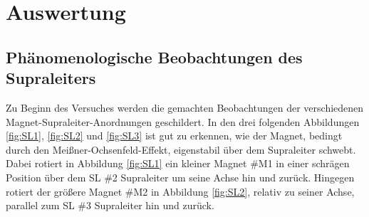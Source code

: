 \section{Auswertung}
\label{sec:Auswertung}

\subsection{Phänomenologische Beobachtungen des Supraleiters}
Zu Beginn des Versuches werden die gemachten Beobachtungen der verschiedenen
Magnet-Supraleiter-Anordnungen geschildert. In den drei folgenden Abbildungen
\ref{fig:SL1}, \ref{fig:SL2} und \ref{fig:SL3} ist gut zu erkennen,
wie der Magnet, bedingt durch den Meißner-Ochsenfeld-Effekt, eigenstabil über dem
Supraleiter schwebt. Dabei rotiert in Abbildung \ref{fig:SL1} ein kleiner Magnet
\#M1 in einer schrägen Position über dem SL \#2 Supraleiter um seine Achse hin und zurück.
Hingegen rotiert der größere Magnet \#M2 in Abbildung \ref{fig:SL2}, relativ zu
seiner Achse, parallel zum SL \#3 Supraleiter hin und zurück.

